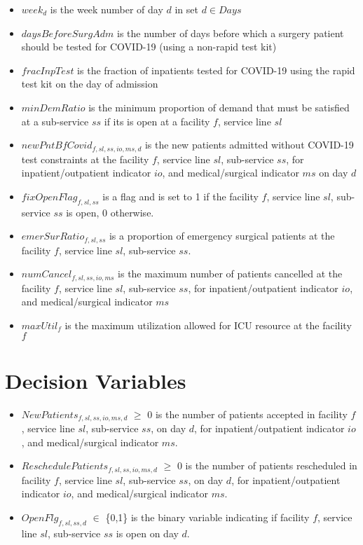 \documentclass[10pt, letterpaper]{article}
\begin{document}
\begin{itemize}
\item[ ] $week_{d}$ is the week number of day $d$ in set $ d \in Days$
\item[ ] $daysBeforeSurgAdm$ is the number of days before which a surgery patient should be tested for COVID-19 (using a non-rapid test kit) 
\item[ ] $fracInpTest$ is the fraction of inpatients tested for COVID-19 using the rapid test kit on the day of admission 
\item[ ] $minDemRatio$ is the minimum proportion of demand that must be satisfied at a sub-service $ss$ if its is open at a facility $f$, service line $sl$ 
\item[ ] $newPntBfCovid_{f,sl,ss,io,ms,d}$ is the new patients admitted without COVID-19 test constraints at the facility $f$, service line $sl$, sub-service $ss$, for inpatient/outpatient indicator $io$, and medical/surgical indicator $ms$ on day $d$ 
\item[ ] $fixOpenFlag_{f,sl,ss}$ is a flag and is set to 1 if the facility $f$, service line $sl$, sub-service $ss$ is open, 0 otherwise. 
\item[ ] $emerSurRatio_{f,sl,ss}$ is a proportion of emergency surgical patients at the facility $f$, service line $sl$, sub-service $ss$. 
\item[ ] $numCancel_{f,sl,ss,io,ms}$ is the maximum number of patients cancelled at the facility $f$, service line $sl$, sub-service $ss$, for inpatient/outpatient indicator $io$, and medical/surgical indicator $ms$
\item[ ] $maxUtil_{f}$ is the maximum utilization allowed for ICU resource at the facility $f$ 
\end{itemize}

\section*{Decision Variables}
\begin{itemize}
\item [ ] $NewPatients_{f,sl,ss,io,ms,d}$ $\geq$ {0} is the number of patients accepted in facility $f$, service line $sl$, sub-service $ss$, on day $d$, for inpatient/outpatient indicator $io$, and medical/surgical indicator $ms$.
\item [ ] $ReschedulePatients_{f,sl,ss,io,ms,d}$ $\geq$ {0} is the number of patients rescheduled in facility $f$, service line $sl$, sub-service $ss$, on day $d$, for inpatient/outpatient indicator $io$, and medical/surgical indicator $ms$.
\item [ ] $OpenFlg_{f,sl,ss,d}$ $\in$ \{0,1\} is the binary variable indicating if facility $f$, service line $sl$, sub-service $ss$ is open on day $d$.
\end{itemize}
\end{document}
